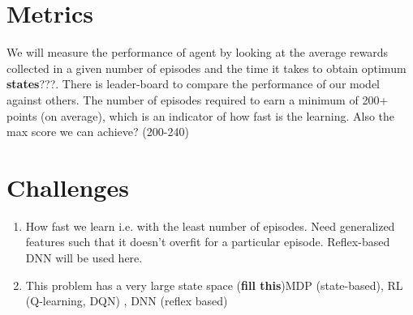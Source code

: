 \documentclass[12pt]{article}
\begin{document}
\section{Metrics}
We will measure the performance of agent by looking at the average rewards collected in a given number of episodes and the time it takes to obtain optimum \textbf{states}???. There is leader-board to compare the performance of our model against others. \citep{leaderboard}
\newline
 The number of episodes required to earn a minimum of 200+ points (on average), which is an indicator of how fast is the learning.\newline
Also the max score we can achieve? (200-240)


\section{Challenges}
\begin{enumerate}[label=(\alph*)]
\item How fast we learn i.e. with the least number of episodes. Need generalized features such that it doesn’t overfit for a particular episode. Reflex-based DNN will be used here.
\item This problem has a very large state space (\textbf{fill this})MDP (state-based), RL (Q-learning, DQN) , DNN (reflex based)
\end{enumerate}



\end{document}

